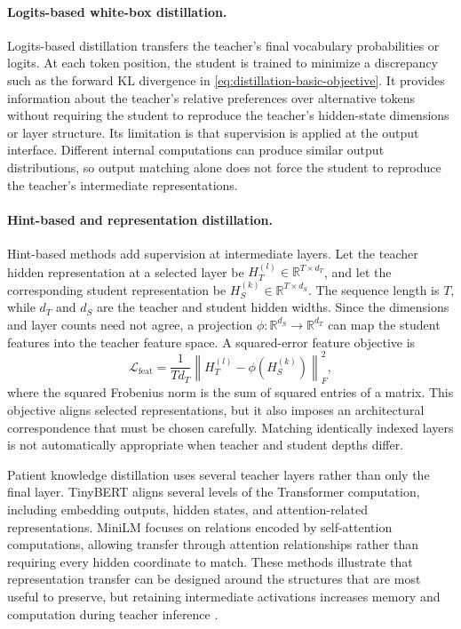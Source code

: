 \paragraph{Logits-based white-box distillation.}
Logits-based distillation transfers the teacher's final vocabulary
probabilities or logits.  At each token position, the student is trained to
minimize a discrepancy such as the forward KL divergence in
\cref{eq:distillation-basic-objective}.  It provides information about the
teacher's relative preferences over alternative tokens without requiring
the student to reproduce the teacher's hidden-state dimensions or layer
structure.  Its limitation is that supervision is applied at the output
interface.  Different internal computations can produce similar output
distributions, so output matching alone does not force the student to
reproduce the teacher's intermediate representations.

\paragraph{Hint-based and representation distillation.}
Hint-based methods add supervision at intermediate layers.  Let the teacher
hidden representation at a selected layer be
\(H_T^{(l)}\in\mathbb R^{T\times d_T}\), and let the corresponding
student representation be
\(H_S^{(k)}\in\mathbb R^{T\times d_S}\).  The sequence length is
\(T\), while \(d_T\) and \(d_S\) are the teacher and student hidden
widths.  Since the dimensions and layer counts need not agree, a projection
\(\phi:\mathbb R^{d_S}\to\mathbb R^{d_T}\) can map the student
features into the teacher feature space.  A squared-error feature objective
is
\begin{equation}
    \mathcal L_{\mathrm{feat}}
    =\frac{1}{T d_T}
    \left\|H_T^{(l)}-\phi(H_S^{(k)})\right\|_F^2,
    \label{eq:distillation-feature-loss}
\end{equation}
where the squared Frobenius norm is the sum of squared entries of a matrix.  This
objective aligns selected representations, but it also imposes an
architectural correspondence that must be chosen carefully.  Matching
identically indexed layers is not automatically appropriate when teacher
and student depths differ.

Patient knowledge distillation uses several teacher layers rather than
only the final layer.  TinyBERT aligns several
levels of the Transformer computation, including embedding outputs, hidden
states, and attention-related representations.  MiniLM focuses on relations
encoded by self-attention computations, allowing transfer through attention
relationships rather than requiring every hidden coordinate to match.  These
methods illustrate that representation transfer can be designed around the
structures that are most useful to preserve, but retaining intermediate
activations increases memory and computation during teacher inference
\parencite{Yang2024SurveyKD}.


